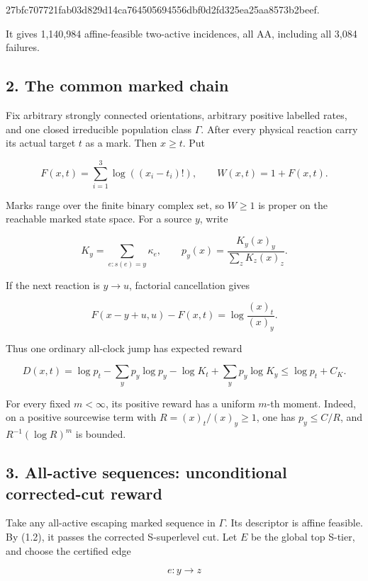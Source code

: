\begin{CodeBlock}
27bfc707721fab03d829d14ca764505694556dbf0d2fd325ea25aa8573b2beef.
\end{CodeBlock}

It gives 1,140,984 affine-feasible two-active incidences, all AA,
including all 3,084 failures.

\subsection{2. The common marked chain}

Fix arbitrary strongly connected orientations, arbitrary positive
labelled rates, and one closed irreducible population class \(\Gamma\).
After every physical reaction carry its actual target \(t\) as a mark.
Then \(x\ge t\). Put

\[
 F(x,t)=\sum_{i=1}^3\log((x_i-t_i)!),
 \qquad W(x,t)=1+F(x,t).                              \tag{2.1}
\]

Marks range over the finite binary complex set, so \(W\ge1\) is proper
on the reachable marked state space. For a source \(y\), write

\[
 K_y=\sum_{e:s(e)=y}\kappa_e,\qquad
 p_y(x)=\frac{K_y(x)_y}{\sum_zK_z(x)_z}.             \tag{2.2}
\]

If the next reaction is \(y\to u\), factorial cancellation gives

\[
 F(x-y+u,u)-F(x,t)=\log\frac{(x)_t}{(x)_y}.          \tag{2.3}
\]

Thus one ordinary all-clock jump has expected reward

\[
 D(x,t)=\log p_t-\sum_yp_y\log p_y-\log K_t+\sum_yp_y\log K_y
       \le\log p_t+C_K.                              \tag{2.4}
\]

For every fixed \(m<\infty\), its positive reward has a uniform \(m\)-th
moment. Indeed, on a positive sourcewise term with
\(R=(x)_t/(x)_y\ge1\), one has \(p_y\le C/R\), and \(R^{-1}(\log R)^m\)
is bounded.

\subsection{3. All-active sequences: unconditional corrected-cut
reward}

Take any all-active escaping marked sequence in \(\Gamma\). Its
descriptor is affine feasible. By (1.2), it passes the corrected
S-superlevel cut. Let \(E\) be the global top S-tier, and choose the
certified edge

\[
                         e:y\longrightarrow z        \tag{3.1}
\]

